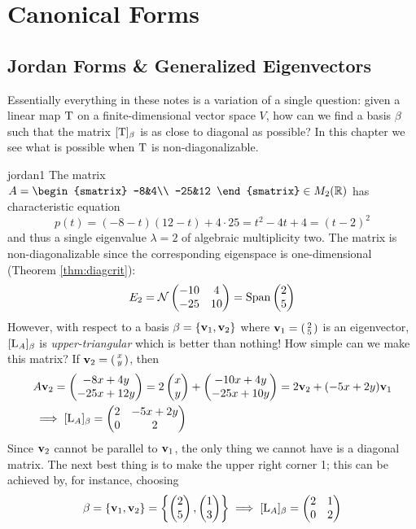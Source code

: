 \graphicspath{{notes/3canonical/asy/}}

\setcounter{section}{2}

\section{Canonical Forms}

\subsection{Jordan Forms \& Generalized Eigenvectors}

Essentially everything in these notes is a variation of a single question: given a linear map $\mathrm{T}$ on a finite-dimensional vector space $V$, how can we find a basis $\beta$ such that the matrix $[\mathrm{T}]_\beta$ is as close to diagonal as possible? In this chapter we see what is possible when $\mathrm{T}$ is non-diagonalizable.


\begin{example}{}{jordan1}
	The matrix $A=
	\begin{smatrix}
		-8&4\\
		-25&12
	\end{smatrix}
	\in M_2(\R)$ has characteristic equation
	\[
		p(t)=(-8-t)(12-t)+4\cdot 25=t^2-4t+4=(t-2)^2
	\]
	and thus a single eigenvalue $\lambda=2$ of algebraic multiplicity two. The matrix is non-diagonalizable since the corresponding eigenspace is one-dimensional (Theorem \ref{thm:diagcrit}):
	\[
		E_2 =\mathcal{N}
		\begin{pmatrix}
			-10&4\\
			-25&10
		\end{pmatrix}
		=\operatorname{Span}\begin{pmatrix}2\\5\end{pmatrix}
	\]
	However, with respect to a basis $\beta=\{{\mathbf{v}}_1,{\mathbf{v}}_2\}$ where ${\mathbf{v}}_1=\left(\begin{smallmatrix}2\\5\end{smallmatrix}\right)$ is an eigenvector, $[\mathrm{L}_A]_\beta$ is \emph{upper-triangular} which is better than nothing! How simple can we make this matrix? If ${\mathbf{v}}_2=\left(\begin{smallmatrix}x\\y\end{smallmatrix}\right)$, then
	\begin{align*}
		&A{\mathbf{v}}_2=\begin{pmatrix}-8x+4y\\-25x+12y\end{pmatrix}=2\begin{pmatrix}x\\y\end{pmatrix}+\begin{pmatrix}-10x+4y\\-25x+10y\end{pmatrix}=2{\mathbf{v}}_2+(-5x+2y){\mathbf{v}}_1\\
		&\implies [\mathrm{L}_A]_\beta=
		\begin{pmatrix}
			2&-5x+2y\\
			0&2
		\end{pmatrix}
	\end{align*}
	Since ${\mathbf{v}}_2$ cannot be parallel to ${\mathbf{v}}_1$, the only thing we cannot have is a diagonal matrix. The next best thing is to make the upper right corner 1; this can be achieved by, for instance, choosing
	\[
		\beta=\{{\mathbf{v}}_1,{\mathbf{v}}_2\}=\left\{\begin{pmatrix}2\\5\end{pmatrix},\begin{pmatrix}1\\3\end{pmatrix}\right\}
		\implies [\mathrm{L}_A]_\beta=
		\begin{pmatrix}
			2&1\\
			0&2
		\end{pmatrix}
	\]
\end{example}


